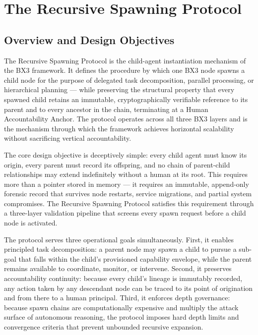 \section{The Recursive Spawning Protocol}\label{sec:recursive-spawning}


\subsection{Overview and Design Objectives}

The Recursive Spawning Protocol is the child-agent instantiation mechanism of the BX3 framework. It defines the procedure by which one BX3 node spawns a child node for the purpose of delegated task decomposition, parallel processing, or hierarchical planning — while preserving the structural property that every spawned child retains an immutable, cryptographically verifiable reference to its parent and to every ancestor in the chain, terminating at a Human Accountability Anchor. The protocol operates across all three BX3 layers and is the mechanism through which the framework achieves horizontal scalability without sacrificing vertical accountability.

The core design objective is deceptively simple: every child agent must know its origin, every parent must record its offspring, and no chain of parent-child relationships may extend indefinitely without a human at its root. This requires more than a pointer stored in memory — it requires an immutable, append-only forensic record that survives node restarts, service migrations, and partial system compromises. The Recursive Spawning Protocol satisfies this requirement through a three-layer validation pipeline that screens every spawn request before a child node is activated.

The protocol serves three operational goals simultaneously. First, it enables principled task decomposition: a parent node may spawn a child to pursue a sub-goal that falls within the child's provisioned capability envelope, while the parent remains available to coordinate, monitor, or intervene. Second, it preserves accountability continuity: because every child's lineage is immutably recorded, any action taken by any descendant node can be traced to its point of origination and from there to a human principal. Third, it enforces depth governance: because spawn chains are computationally expensive and multiply the attack surface of autonomous reasoning, the protocol imposes hard depth limits and convergence criteria that prevent unbounded recursive expansion.

